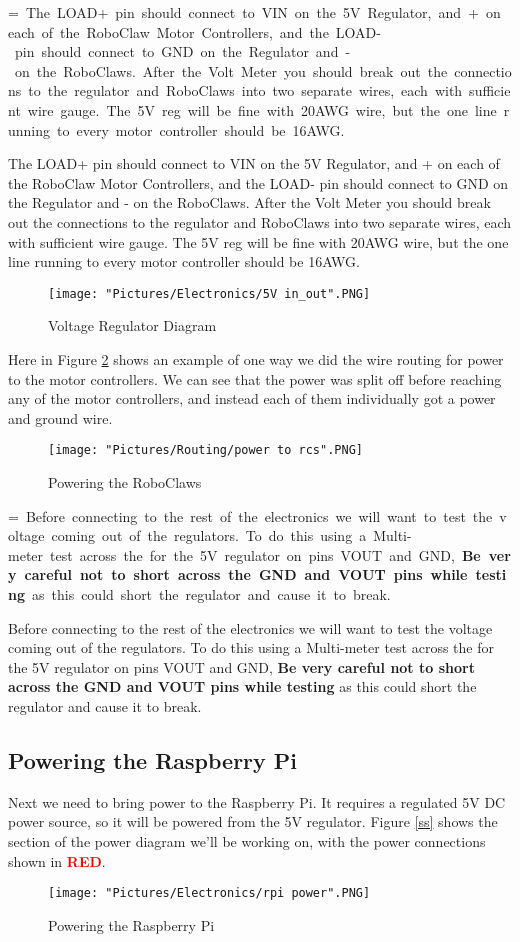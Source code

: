 \documentclass[12pt]{article}
\makeatletter
\newcommand{\mybox}[1]{%
  \setbox0=\hbox{#1}%
  \setlength{\@tempdima}{\dimexpr\wd0+13pt}%
  \begin{tcolorbox}[colframe=mycolor,boxrule=0.5pt,arc=4pt,
      left=6pt,right=6pt,top=6pt,bottom=6pt,boxsep=0pt,width=0.95\textwidth]
    #1
  \end{tcolorbox}
}
\makeatother
\begin{document}
\mybox{
\noindent  The LOAD+ pin should connect to VIN on the 5V Regulator, and + on each of the RoboClaw Motor Controllers, and the LOAD- pin should connect to GND on the Regulator and - on the RoboClaws. After the Volt Meter you should break out the connections to the regulator and RoboClaws into two separate wires, each with sufficient wire gauge. The 5V reg will be fine with 20AWG wire, but the one line running to every motor controller should be 16AWG.  
}

\begin{figure}[H]
  	\centering
    	\texttt{[image: "Pictures/Electronics/5V in\_out".PNG]}
 	\caption{Voltage Regulator Diagram}
	\label{regs}
\end{figure}

\noindent Here in Figure \ref{vm2rcs} shows an example of one way we did the wire routing for power to the motor controllers. We can see that the power was split off before reaching any of the motor controllers, and instead each of them individually got a power and ground wire. 

\begin{figure}[H]
  	\centering
    	\texttt{[image: "Pictures/Routing/power to rcs".PNG]}
 	\caption{Powering the RoboClaws}
	\label{vm2rcs}
\end{figure}


\mybox{
Before connecting to the rest of the electronics we will want to test the voltage coming out of the regulators. To do this using a Multi-meter test across the  for the 5V regulator on pins VOUT and GND, \textbf{Be very careful not to short across the GND and VOUT pins while testing} as this could short the regulator and cause it to break.
}

\subsection{Powering the Raspberry Pi}
Next we need to bring power to the Raspberry Pi. It requires a regulated 5V DC power source, so it will be powered from the 5V regulator. Figure \ref{ss} shows the section of the power diagram we'll be working on, with the power connections shown in \textcolor{red}{\textbf{RED}}.

\begin{figure}[H]
  	\centering
    	\texttt{[image: "Pictures/Electronics/rpi power".PNG]}
 	\caption{Powering the Raspberry Pi}
	\label{rpi power}
\end{figure}
\end{document}
